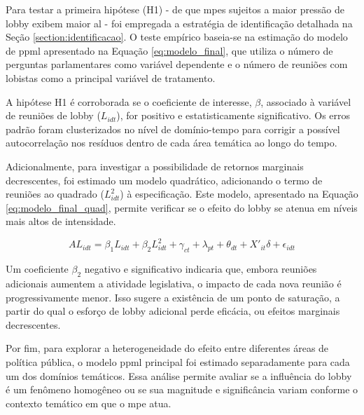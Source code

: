Para testar a primeira hipótese (H1) - de que \acrshort{mpe}s sujeitos a maior pressão de lobby exibem maior \acrshort{al} - foi empregada a estratégia de identificação detalhada na Seção \ref{section:identificacao}. O teste empírico baseia-se na estimação do modelo de \acrshort{ppml} apresentado na Equação \ref{eq:modelo_final}, que utiliza o número de perguntas parlamentares como variável dependente e o número de reuniões com lobistas como a principal variável de tratamento.

A hipótese H1 é corroborada se o coeficiente de interesse, $\beta$, associado à variável de reuniões de lobby ($L_{idt}$), for positivo e estatisticamente significativo. Os erros padrão foram clusterizados no nível de domínio-tempo para corrigir a possível autocorrelação nos resíduos dentro de cada área temática ao longo do tempo.

Adicionalmente, para investigar a possibilidade de retornos marginais decrescentes, foi estimado um modelo quadrático, adicionando o termo de reuniões ao quadrado ($L_{idt}^2$) à especificação. Este modelo, apresentado na Equação \ref{eq:modelo_final_quad}, permite verificar se o efeito do lobby se atenua em níveis mais altos de intensidade.

\begin{equation}
    \label{eq:modelo_final_quad}
    AL_{idt} = \beta_1 L_{idt} + \beta_2 L_{idt}^2 + \gamma_{ct} + \lambda_{pt} + \theta_{dt} + X'_{it}\delta + \epsilon_{idt}
\end{equation}

Um coeficiente $\beta_2$ negativo e significativo indicaria que, embora reuniões adicionais aumentem a atividade legislativa, o impacto de cada nova reunião é progressivamente menor. Isso sugere a existência de um ponto de saturação, a partir do qual o esforço de lobby adicional perde eficácia, ou efeitos marginais decrescentes.

Por fim, para explorar a heterogeneidade do efeito entre diferentes áreas de política pública, o modelo \acrshort{ppml} principal foi estimado separadamente para cada um dos domínios temáticos. Essa análise permite avaliar se a influência do lobby é um fenômeno homogêneo ou se sua magnitude e significância variam conforme o contexto temático em que o \acrshort{mpe} atua.

